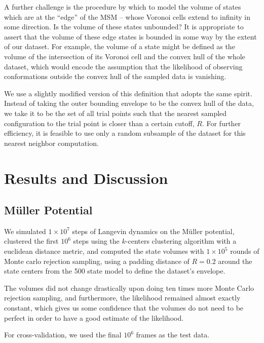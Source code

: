 \documentclass[twocolumn,floatfix,nofootinbib,aps]{revtex4-1}
\begin{document}
A further challenge is the procedure by which to model the volume of states which are at the ``edge'' of the MSM -- whose Voronoi cells extend to infinity in some direction. Is the volume of these states unbounded? It is appropriate to assert that the volume of these edge states is bounded in some way by the extent of our dataset. For example, the volume of a state might be defined as the volume of the intersection of its Voronoi cell and the convex hull of the whole dataset, which would encode the assumption that the likelihood of observing conformations outside the convex hull of the sampled data is vanishing.

We use a slightly modified version of this definition that adopts the same spirit. Instead of taking the outer bounding envelope to be the convex hull of the data, we take it to be the set of all trial points such that the nearest sampled configuration to the trial point is closer than a certain cutoff, $R$. For further efficiency, it is feasible to use only a random subsample of the dataset for this nearest neighbor computation.

\section{Results and Discussion}
\subsection{M\"{u}ller Potential}
We simulated $1\times 10^7$ steps of Langevin dynamics on the M\"{u}ller potential, clustered the first $10^6$ steps using the $k$-centers clustering algorithm with a euclidean distance metric, and computed the state volumes with $1\times 10^5$ rounds of Monte carlo rejection sampling, using a padding distance of $R=0.2$ around the state centers from the 500 state model to define the dataset's envelope.

The volumes did not change drastically upon doing ten times more Monte Carlo rejection sampling, and furthermore, the likelihood remained almost exactly constant, which gives us some confidence that the volumes do not need to be perfect in order to have a good estimate of the likelihood. 

For cross-validation, we used the final $10^6$ frames as the test data.
\end{document}
